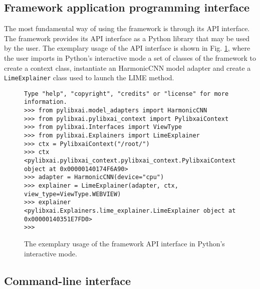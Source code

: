 \documentclass[
    bindingoffset=5mm,  %
    footnoteindent=3mm, %
    hyphenation=true    %
]{src/wut-thesis}
\begin{document}
\subsection{Framework application programming interface}

The most fundamental way of using the framework is through its API interface.
The framework provides its API interface as a Python library that may be used
by the user. The exemplary usage of the API interface is shown in Fig. \ref{fig:ApiUsage},
where the user imports in Python's interactive mode a set of classes of the framework to create a
context class, instantiate an HarmonicCNN model adapter and create a \texttt{LimeExplainer} class
used to launch the LIME method.

\begin{figure}%
\begin{verbatim}
Type "help", "copyright", "credits" or "license" for more information.
>>> from pylibxai.model_adapters import HarmonicCNN
>>> from pylibxai.pylibxai_context import PylibxaiContext
>>> from pylibxai.Interfaces import ViewType
>>> from pylibxai.Explainers import LimeExplainer
>>> ctx = PylibxaiContext("/root/")
>>> ctx
<pylibxai.pylibxai_context.pylibxai_context.PylibxaiContext object at 0x00000140174F6A90>
>>> adapter = HarmonicCNN(device="cpu")
>>> explainer = LimeExplainer(adapter, ctx, view_type=ViewType.WEBVIEW)
>>> explainer
<pylibxai.Explainers.lime_explainer.LimeExplainer object at 0x00000140351E7FD0>
>>>
\end{verbatim}
\caption{The exemplary usage of the framework API interface in Python's interactive mode.}
\label{fig:ApiUsage}
\end{figure}

\subsection{Command-line interface} \label{ch4:CmdTool}
\end{document}

